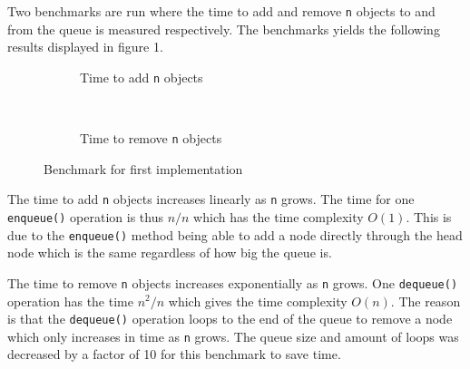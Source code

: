 \documentclass[a4paper,11pt]{article}
\begin{document}
Two benchmarks are run where the time to add and remove {\tt n} 
objects to and from the queue is measured respectively. The benchmarks 
yields the following results displayed in figure 1.

\begin{figure*}[ht!]
  \centering
  \begin{subfigure}[t]{0.47\textwidth}
    \caption{Time to add {\tt n} objects}
    \label{fig:subplot1}
  \end{subfigure}
  ~
  \begin{subfigure}[t]{0.5\textwidth}
    \caption{Time to remove {\tt n} objects}
    \label{fig:subplot2}
  \end{subfigure}
  \caption{Benchmark for first implementation}
  \label{fig:plot1}
\end{figure*}

The time to add {\tt n} objects increases linearly as {\tt n} grows. 
The time for one {\tt enqueue()} operation is thus $ n/n$ which has the 
time complexity $ O(1)$. This is due to the {\tt enqueue()} method 
being able to add a node directly through the head node which is the
same regardless of how big the queue is.

The time to remove {\tt n} objects increases exponentially as {\tt n} 
grows. One {\tt dequeue()} operation has the time $ n^2/n$ which gives 
the time complexity $ O(n)$. The reason is that the {\tt dequeue()} 
operation loops to the end of the queue to remove a node which only
increases in time as {\tt n} grows. The queue size and amount of 
loops was decreased by a factor of 10 for this benchmark to save time.
\end{document}
